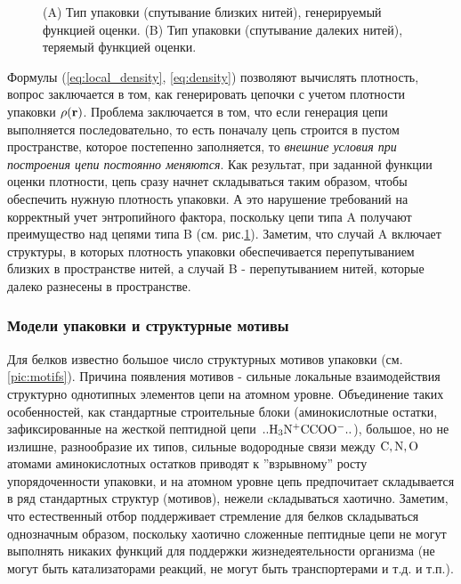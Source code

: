 \documentclass[tikz,a4paper]{scrartcl} %
\begin{document}
\begin{figure}[h]
\caption{(A) Тип упаковки (спутывание близких нитей), генерируемый функцией оценки. (B) Тип упаковки (спутывание далеких нитей), теряемый функцией оценки.}
\label{pic:fold}
\end{figure}
 
Формулы (\ref{eq:local_density}, \ref{eq:density}) позволяют вычислять плотность, вопрос заключается в том, как генерировать цепочки с учетом плотности упаковки $\rho(\bold r)$. Проблема заключается в том, что если генерация цепи выполняется последовательно, то есть поначалу цепь строится в пустом пространстве, которое постепенно заполняется, то \textit{внешние условия при построения цепи постоянно меняются}. Как результат, при заданной функции оценки плотности, цепь сразу начнет складываться таким образом, чтобы обеспечить нужную плотность упаковки. А это нарушение требований на корректный учет энтропийного фактора, поскольку цепи типа A получают преимущество над цепями типа B (см. рис.\ref{pic:fold}). Заметим, что случай A включает структуры, в которых плотность упаковки обеспечивается перепутыванием близких в пространстве нитей, а случай B - перепутыванием нитей, которые далеко разнесены в пространстве.

\subsubsection*{Модели упаковки и структурные мотивы}
Для белков известно большое число структурных мотивов упаковки (см.\ref{pic:motifs}). Причина появления мотивов - сильные локальные взаимодействия структурно однотипных элементов цепи на атомном уровне. Объединение таких особенностей, как стандартные строительные блоки (аминокислотные остатки, зафиксированные на жесткой пептидной цепи $\rm ..H_3N^+CCOO^-..$), большое, но не излишне, разнообразие их типов, сильные водородные связи между $\rm C, N, O$ атомами аминокислотных остатков приводят к 
''взрывному'' росту упорядоченности упаковки, и на атомном уровне цепь предпочитает складывается в ряд стандартных структур (мотивов), нежели cкладываться хаотично. Заметим, что естественный отбор поддерживает стремление для белков складываться однозначным образом, поскольку хаотично сложенные пептидные цепи не могут выполнять никаких функций для поддержки жизнедеятельности организма (не могут быть катализаторами реакций, не могут быть транспортерами и т.д. и т.п.).
\end{document}
